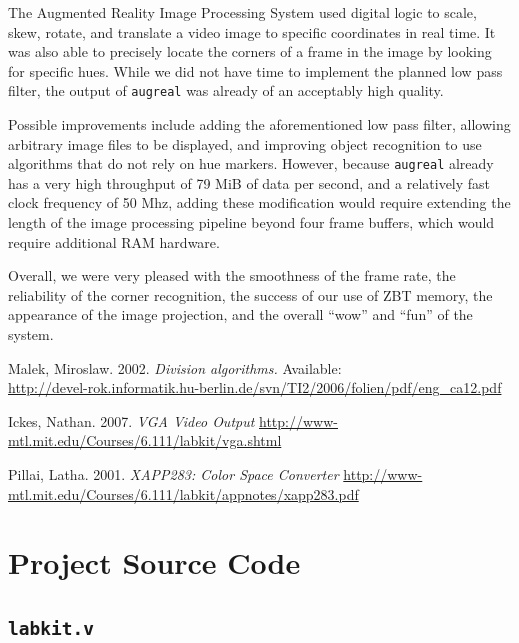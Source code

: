 \documentclass[10pt]{article}
\begin{document}
The Augmented Reality Image Processing System used digital logic to scale, skew, rotate, and translate a video image to specific coordinates in real time. It was also able to precisely locate the corners of a frame in the image by looking for specific hues. While we did not have time to implement the planned low pass filter, the output of {\tt augreal} was already of an acceptably high quality.

Possible improvements include adding the aforementioned low pass filter, allowing arbitrary image files to be displayed, and improving object recognition to use algorithms that do not rely on hue markers. However, because {\tt augreal} already has a very high throughput of 79 MiB of data per second, and a relatively fast clock frequency of 50 Mhz, adding these modification would require extending the length of the image processing pipeline beyond four frame buffers, which would require additional RAM hardware.

Overall, we were very pleased with the smoothness of the frame rate, the reliability of the corner recognition, the success of our use of ZBT memory, the appearance of the image projection, and the overall ``wow'' and ``fun'' of the system.

\begin{thebibliography}{9}

  Malek, Miroslaw.
  2002.
  \emph{Division algorithms.}
  Available: \\ \url{http://devel-rok.informatik.hu-berlin.de/svn/TI2/2006/folien/pdf/eng\_ca12.pdf}

  Ickes, Nathan.
  2007.
  \emph{VGA Video Output}
  \url{http://www-mtl.mit.edu/Courses/6.111/labkit/vga.shtml}

  Pillai, Latha.
  2001.
  \emph{XAPP283: Color Space Converter}
  \url{http://www-mtl.mit.edu/Courses/6.111/labkit/appnotes/xapp283.pdf}

\end{thebibliography}

\newpage
\appendix
\section{Project Source Code}
\subsection{{\tt labkit.v}}


	  	
\end{document}

